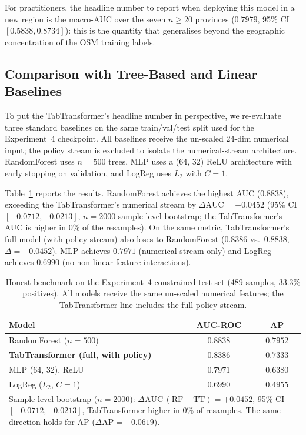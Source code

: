 \documentclass[12pt, a4paper]{article}
\begin{document}
For practitioners, the headline number to report when
deploying this model in a new region is the macro-AUC over the
seven $n\geq 20$ provinces ($0.7979$, 95\% CI $[0.5838,
0.8734]$): this is the quantity that generalises beyond the
geographic concentration of the OSM training labels.

\subsection{Comparison with Tree-Based and Linear Baselines}
\label{sec:baselines}

To put the TabTransformer's headline number in perspective, we
re-evaluate three standard baselines on the same train/val/test
split used for the Experiment~4 checkpoint. All baselines
receive the un-scaled 24-dim numerical input; the policy stream
is excluded to isolate the numerical-stream architecture.
RandomForest uses $n=500$ trees, MLP uses a (64, 32) ReLU
architecture with early stopping on validation, and LogReg uses
$L_2$ with $C=1$.

Table~\ref{tab:baselines} reports the results. RandomForest
achieves the highest AUC ($0.8838$), exceeding the
TabTransformer's numerical stream by $\Delta\text{AUC}=+0.0452$
(95\% CI $[-0.0712, -0.0213]$, $n=2000$ sample-level
bootstrap; the TabTransformer's AUC is higher in $0\%$ of the
resamples). On the same metric, TabTransformer's full model
(with policy stream) also loses to RandomForest
($0.8386$ vs.\ $0.8838$, $\Delta=-0.0452$). MLP achieves
$0.7971$ (numerical stream only) and LogReg achieves
$0.6990$ (no non-linear feature interactions).

\begin{table}[H]
\centering
\caption{Honest benchmark on the Experiment~4 constrained test
set (489 samples, 33.3\% positives). All models receive the
same un-scaled numerical features; the TabTransformer line
includes the full policy stream.}
\label{tab:baselines}
\small
\begin{tabular}{lcc}
\toprule
\textbf{Model} & \textbf{AUC-ROC} & \textbf{AP} \\
\midrule
RandomForest ($n=500$)                   & $\mathbf{0.8838}$ & $\mathbf{0.7952}$ \\
\textbf{TabTransformer (full, with policy)} & $\mathbf{0.8386}$ & $\mathbf{0.7333}$ \\
MLP (64, 32), ReLU                       & $0.7971$ & $0.6380$ \\
LogReg ($L_2$, $C=1$)                    & $0.6990$ & $0.4955$ \\
\bottomrule
\multicolumn{3}{p{0.85\textwidth}}{\small
  Sample-level bootstrap ($n=2000$):
  $\Delta\text{AUC}\,(\text{RF}-\text{TT})=+0.0452$,
  95\% CI $[-0.0712, -0.0213]$, TabTransformer higher in
  $0\%$ of resamples. The same direction holds for AP
  ($\Delta\text{AP}=+0.0619$).} \\
\end{tabular}
\end{table}
\end{document}
